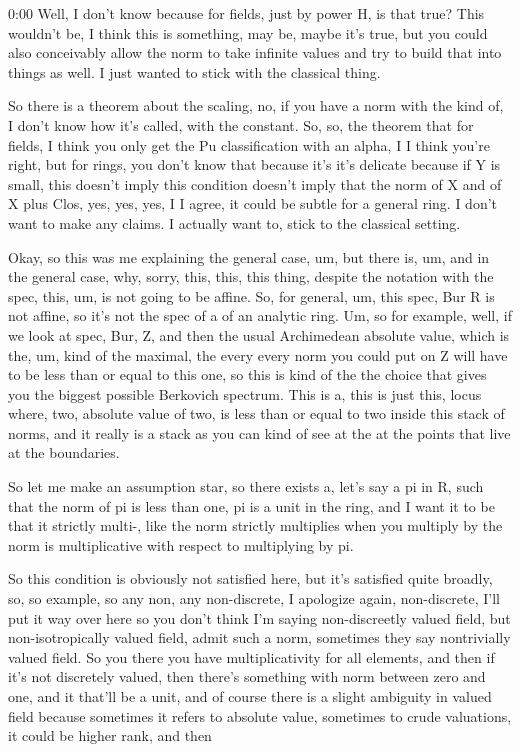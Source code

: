\begin{unfinished}{0:00}
Well, I don't know because for fields, just by power H, is that true? This wouldn't be, I think this is something, may be, maybe it's true, but you could also conceivably allow the norm to take infinite values and try to build that into things as well. I just wanted to stick with the classical thing.

So there is a theorem about the scaling, no, if you have a norm with the kind of, I don't know how it's called, with the constant. So, so, the theorem that for fields, I think you only get the Pu classification with an alpha, I I think you're right, but for rings, you don't know that because it's it's delicate because if Y is small, this doesn't imply this condition doesn't imply that the norm of X and of X plus Clos, yes, yes, yes, I I agree, it could be subtle for a general ring. I don't want to make any claims. I actually want to, stick to the classical setting.

Okay, so this was me explaining the general case, um, but there is, um, and in the general case, why, sorry, this, this, this thing, despite the notation with the spec, this, um, is not going to be affine. So, for general, um, this spec, Bur R is not affine, so it's not the spec of a of an analytic ring. Um, so for example, well, if we look at spec, Bur, Z, and then the usual Archimedean absolute value, which is the, um, kind of the maximal, the every every norm you could put on Z will have to be less than or equal to this one, so this is kind of the the choice that gives you the biggest possible Berkovich spectrum. This is a, this is just this, locus where, two, absolute value of two, is less than or equal to two inside this stack of norms, and it really is a stack as you can kind of see at the at the points that live at the boundaries.

So let me make an assumption star, so there exists a, let's say a pi in R, such that the norm of pi is less than one, pi is a unit in the ring, and I want it to be that it strictly multi-, like the norm strictly multiplies when you multiply by the norm is multiplicative with respect to multiplying by pi.

So this condition is obviously not satisfied here, but it's satisfied quite broadly, so, so example, so any non, any non-discrete, I apologize again, non-discrete, I'll put it way over here so you don't think I'm saying non-discreetly valued field, but non-isotropically valued field, admit such a norm, sometimes they say nontrivially valued field. So you there you have multiplicativity for all elements, and then if it's not discretely valued, then there's something with norm between zero and one, and it that'll be a unit, and of course there is a slight ambiguity in valued field because sometimes it refers to absolute value, sometimes to crude valuations, it could be higher rank, and then


\end{unfinished}
